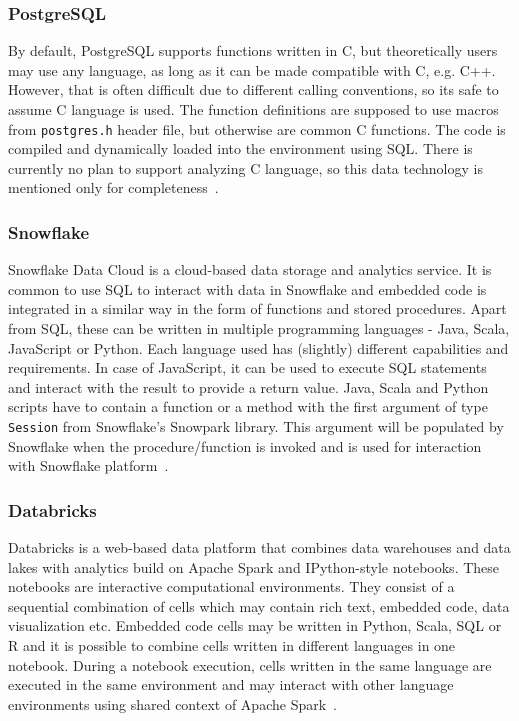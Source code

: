 \subsubsection{PostgreSQL}
By default, PostgreSQL supports functions written in C, but theoretically users may use any language, as long as it can be made compatible with C, e.g. C++. However, that is often difficult due to different calling conventions, so its safe to assume C language is used. The function definitions are supposed to use macros from \texttt{postgres.h} header file, but otherwise are common C functions. The code is compiled and dynamically loaded into the environment using SQL. There is currently no plan to support analyzing C language, so this data technology is mentioned only for completeness~\cite{postgresql}.

\subsubsection{Snowflake}
Snowflake Data Cloud is a cloud-based data storage and analytics service. It is common to use SQL to interact with data in Snowflake and embedded code is integrated in a similar way in the form of functions and stored procedures. Apart from SQL, these can be written in multiple programming languages - Java, Scala, JavaScript or Python. Each language used has (slightly) different capabilities and requirements. In case of JavaScript, it can be used to execute SQL statements and interact with the result to provide a return value. Java, Scala and Python scripts have to contain a function or a method with the first argument of type \texttt{Session} from Snowflake's Snowpark library. This argument will be populated by Snowflake when the procedure/function is invoked and is used for interaction with Snowflake platform~\cite{snowflake}.

\subsubsection{Databricks}
Databricks is a web-based data platform that combines data warehouses and data lakes with analytics build on Apache Spark and IPython-style notebooks. These notebooks are interactive computational environments. They consist of a sequential combination of cells which may contain rich text, embedded code, data visualization etc. Embedded code cells may be written in Python, Scala, SQL or R and it is possible to combine cells written in different languages in one notebook. During a notebook execution, cells written in the same language are executed in the same environment and may interact with other language environments using shared context of Apache Spark~\cite{databricks}.

